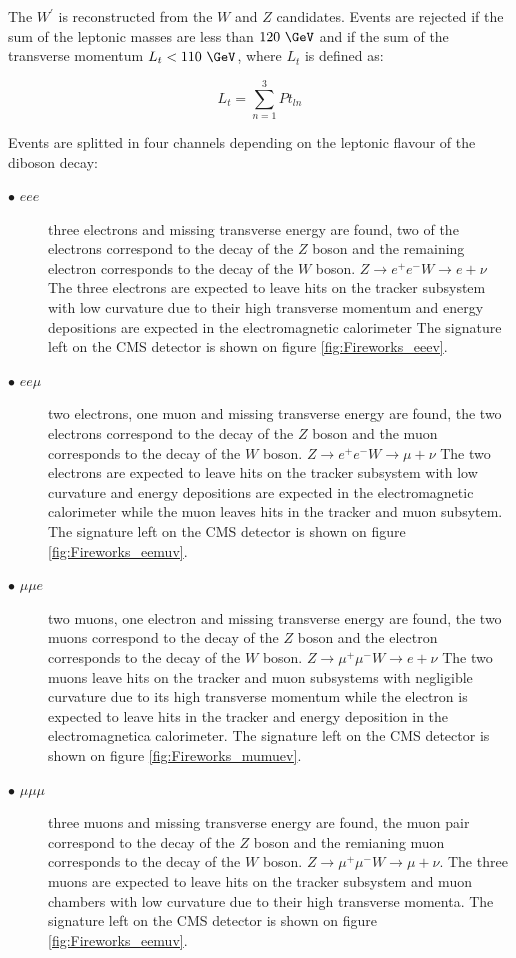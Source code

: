 The $W^{\prime}$ is reconstructed from the $W$ and $Z$ candidates.
Events are rejected if the sum of the leptonic masses are less than $120~\GeV$ and
if the sum of the transverse momentum $L_{t}<110~\GeV$, where $L_{t}$ is defined
as:

\[
L_{t} = \sum_{n=1}^{3} Pt_{ln}
\]

Events are splitted in four channels depending on the leptonic flavour of the
diboson decay:

\begin{description}
\item[$\bullet$ $eee$] three electrons and missing transverse energy are found, two of the
  electrons correspond to the decay of the $Z$ boson and the remaining electron corresponds
  to the decay of the $W$ boson. $Z\rightarrow e^{+}e^{-} W\rightarrow e+\nu$
  The three electrons are expected to leave hits on the
  tracker subsystem with low curvature due to their high transverse momentum and
  energy depositions are expected in the electromagnetic calorimeter
  The signature left on the CMS detector is shown on figure \ref{fig:Fireworks_eeev}.
\item[$\bullet$ $ee\mu$] two electrons, one muon and missing transverse energy are found,
  the two electrons correspond to the decay of the $Z$ boson and the muon corresponds to the
  decay of the $W$ boson. $Z\rightarrow e^{+}e^{-} W\rightarrow \mu+\nu$ The two electrons are
  expected to leave hits on the tracker subsystem with low curvature and energy
  depositions are expected in the electromagnetic calorimeter while the muon leaves
  hits in the tracker and muon subsytem. The signature left on the CMS
  detector is shown on figure \ref{fig:Fireworks_eemuv}.
\item[$\bullet$ $\mu\mu e$] two muons, one electron and missing transverse energy are found,
  the two muons correspond to the decay of the $Z$ boson and the electron corresponds to the
  decay of the $W$ boson. $Z\rightarrow \mu^{+}\mu^{-} W\rightarrow e+\nu$ The two
  muons leave hits on the tracker and muon subsystems with negligible curvature due
  to its high transverse momentum while the electron is expected to leave hits in
  the tracker and energy deposition in the electromagnetica calorimeter.
  The signature left on the CMS detector is shown on figure \ref{fig:Fireworks_mumuev}.
\item[$\bullet$ $\mu\mu\mu$] three muons and missing transverse energy are found, the muon pair
  correspond to the decay of the $Z$ boson and the remianing muon corresponds
  to the decay of the $W$ boson. $Z\rightarrow \mu^{+}\mu^{-} W\rightarrow \mu+\nu$.
  The three muons are expected to leave hits on the tracker subsystem and muon chambers
  with low curvature due to their high transverse momenta. The signature
  left on the CMS detector is shown on figure \ref{fig:Fireworks_eemuv}.
\end{description}

